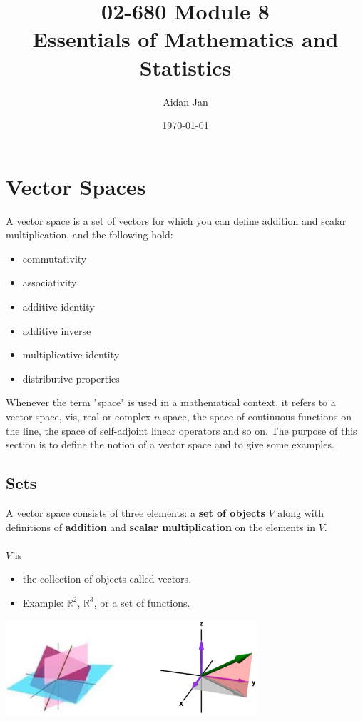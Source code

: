 \documentclass[10pt]{article}
\title{02-680 Module 8 \\ \large{Essentials of Mathematics and Statistics}}
\author{Aidan Jan}
\date{\today}
\begin{document}
\maketitle

\section*{Vector Spaces}
A vector space is a set of vectors for which you can define addition and scalar multiplication, and the following hold:
\begin{itemize}
	\item commutativity
	\item associativity
	\item additive identity
	\item additive inverse
	\item multiplicative identity
	\item distributive properties
\end{itemize}
Whenever the term "space" is used in a mathematical context, it refers to a vector space, vis, real or complex $n$-space, the space of continuous functions on the line, the space of self-adjoint linear operators and so on.  The purpose of this section is to define the notion of a vector space and to give some examples.

\subsection*{Sets}
A vector space consists of three elements: a \textbf{set of objects} $V$ along with definitions of \textbf{addition} and \textbf{scalar multiplication} on the elements in $V$.\\\\
$V$ is
\begin{itemize}
	\item the collection of objects called vectors.
	\item Example: $\mathbb{R}^2$, $\mathbb{R}^3$, or a set of functions.
\end{itemize}
\begin{center} 
	\includegraphics*[width=0.7\textwidth]{M8_1.png} 
\end{center}
\end{document}
